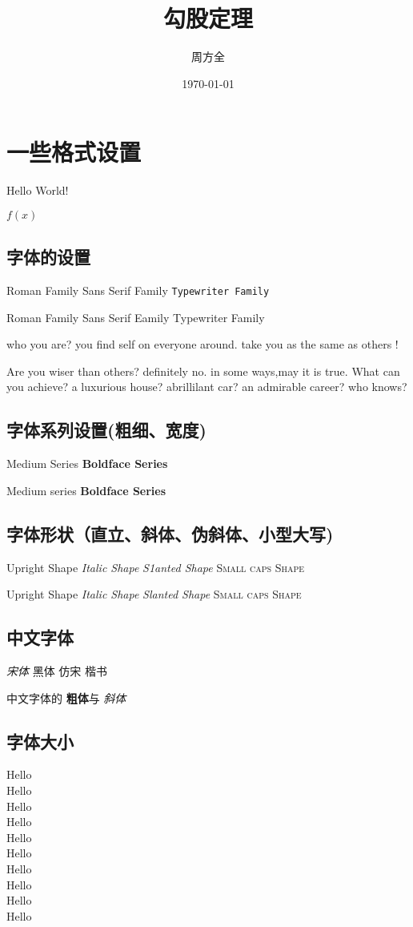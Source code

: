 \documentclass[12pt]{article} %
\title{\songti 勾股定理}
\author{\heiti 周方全}
\date{\today}
\begin{document}
	\maketitle
	\section{一些格式设置}
	Hello World!
	
	$f(x)$
	
	\subsection {字体的设置}
	\textrm{Roman Family} 
	\textsf{Sans Serif Family}
	\texttt{Typewriter Family}
	
	{\rmfamily Roman Family} 
	{\sffamily Sans Serif Eamily} 
	{\ttfamily Typewriter Family}
	
	{\sffamily who you are? you find self on everyone around. take you as the same as others !}
	
	{\ttfamily Are you wiser than others? definitely no. in some ways,may it is true. What can you achieve? a luxurious house? abrillilant car? an admirable career? who knows?}
	
	\subsection {字体系列设置(粗细、宽度)}
	\textmd{Medium Series} 
	\textbf{Boldface Series}
	
	{\mdseries Medium series} 
	{\bfseries Boldface Series}
	
	\subsection {字体形状（直立、斜体、伪斜体、小型大写)}
	\textup{Upright Shape} 
	\textit{Italic Shape}
	\textsl{S1anted Shape} 
	\textsc{Small caps Shape}
	
	{\upshape Upright Shape} 
	{\itshape Italic Shape} 
	{\slshape Slanted Shape} 
	{\scshape Small caps Shape}
	
	\subsection {中文字体}
	{\songti\it 宋体} \quad 
	{\heiti 黑体}  \quad 
	{\fangsong 仿宋}\quad 
	{\kaishu 楷书}
	
	中文字体的 \textbf{粗体}与 \textit{斜体}
	
	\subsection {字体大小}
	{\tiny	       Hello}\\
	{\scriptsize   Hello}\\
	{\footnotesize Hello}\\
	{\small        Hello}\\
	{\normalsize   Hello}\\
	{\large        Hello}\\
	{\Large        Hello}\\
	{\LARGE        Hello}\\
	{\huge         Hello}\\
	{\Huge         Hello}
	
\end{document}
